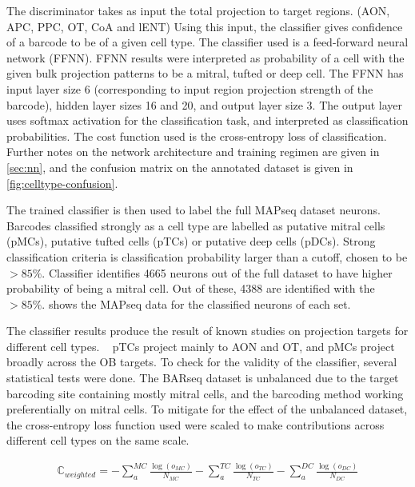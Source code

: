 \documentclass[../dissertation.tex]{subfiles}
\begin{document}
The discriminator takes as input the total projection to target regions. (AON, APC, PPC, OT, CoA and lENT)
Using this input, the classifier gives confidence of a barcode to be of a given cell type.
The classifier used is a feed-forward neural network (FFNN).
FFNN results were interpreted as probability of a cell with the given bulk projection patterns to be a mitral, tufted or deep cell.
The FFNN has input layer size 6 (corresponding to input region projection strength of the barcode), hidden layer sizes 16 and 20, and output layer size 3.
The output layer uses softmax activation for the classification task, and interpreted as classification probabilities.
The cost function used is the cross-entropy loss of classification.
Further notes on the network architecture and training regimen are given in \cref{sec:nn}, and the confusion matrix on the annotated dataset is given in
\cref{fig:celltype-confusion}.

The trained classifier is then used to label the full MAPseq dataset neurons.
Barcodes classified strongly as a cell type are labelled as putative mitral cells (pMCs), putative tufted cells (pTCs) or putative deep cells (pDCs).
Strong classification criteria is classification probability larger than a cutoff, chosen to be $>85\%$.
Classifier identifies 4665 neurons out of the full dataset to have higher probability of being a mitral cell.
Out of these, 4388 are identified with the $>85\%$.
 shows the MAPseq data for the classified neurons of each set.

The classifier results produce the result of known studies on projection targets for different cell types.
~\cite{mapseq016,mapseq017,mapseq019,mapseq020,mapseq021}
pTCs project mainly to AON and OT, and pMCs project broadly across the OB targets. 
To check for the validity of the classifier, several statistical tests were done.
The BARseq dataset is unbalanced due to the target barcoding site containing mostly mitral cells, and the barcoding method working preferentially on mitral cells.
To mitigate for the effect of the unbalanced dataset, the cross-entropy loss function used were scaled to make contributions across different cell types on the same scale.

\begin{align}
    \mathbb{C}_{weighted} = - \sum_a^{MC} \frac{\log (o_{MC})}{N_{MC}} - \sum_a^{TC} \frac{\log (o_{TC})}{N_{TC}} - \sum_a^{DC} \frac{\log (o_{DC})}{N_{DC}}
\end{align}
\end{document}
